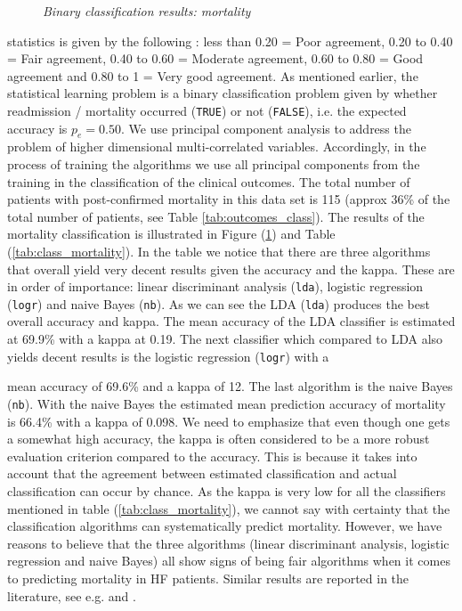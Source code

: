 \documentclass[../thesis.tex]{subfiles}
\begin{document}
\begin{figure}[h!]
    \centering
    \scalebox{.8}{}
    \caption[Binary classification results: mortality]{\textit{Binary classification results: mortality}}
    \label{fig:bi_class_mort}
\end{figure}

\newpage
\noindent statistics is given by the following \citep{ashby1991practical}: less than 0.20 = Poor agreement, 0.20 to 0.40 = Fair agreement, 0.40 to 0.60 = Moderate agreement, 0.60 to 0.80 = Good agreement and 0.80 to 1 = Very good agreement. As mentioned earlier, the statistical learning problem is a binary classification problem given by whether  readmission / mortality occurred (\texttt{TRUE}) or not (\texttt{FALSE}), i.e. the expected accuracy is $p_e = 0.50$. We use principal component analysis to address the problem of higher dimensional multi-correlated variables. Accordingly, in the process of training the algorithms we use all principal components from the training in the classification of the clinical outcomes. The total number of patients with post-confirmed mortality in this data set is 115 (approx 36\% of the total number of patients, see Table \ref{tab:outcomes_class}). The results of the mortality classification is illustrated in Figure (\ref{fig:bi_class_mort}) and Table (\ref{tab:class_mortality}). In the table we notice that there are three algorithms that overall yield very decent results given the accuracy and the kappa. These are in order of importance: linear discriminant analysis (\texttt{lda}), logistic regression (\texttt{logr}) and naive Bayes (\texttt{nb}). As we can see the LDA (\texttt{lda}) produces the best overall accuracy and kappa. The mean accuracy of the LDA classifier is estimated at 69.9\% with a kappa at 0.19. The next classifier which compared to LDA also yields decent results is the logistic regression (\texttt{logr}) with a


\newpage
\noindent mean accuracy of 69.6\% and a kappa of 12. The last algorithm is the naive Bayes (\texttt{nb}). With the naive Bayes the estimated mean prediction accuracy of mortality is 66.4\% with a kappa of 0.098. We need to emphasize that even though one gets a somewhat high accuracy, the kappa is often considered to be a more robust evaluation criterion compared to the accuracy. This is because it takes into account that the agreement between estimated classification and actual classification can occur by chance. As the kappa is very low for all the classifiers mentioned in table (\ref{tab:class_mortality}), we cannot say with certainty that the classification algorithms can systematically predict mortality. However, we have reasons to believe that the three algorithms (linear discriminant analysis, logistic regression and naive Bayes) all show signs of being fair algorithms when it comes to predicting mortality in HF patients. Similar results are reported in the literature, see e.g. \cite{shah2014phenomapping} and \cite{panahiazar2015using}.
\end{document}
